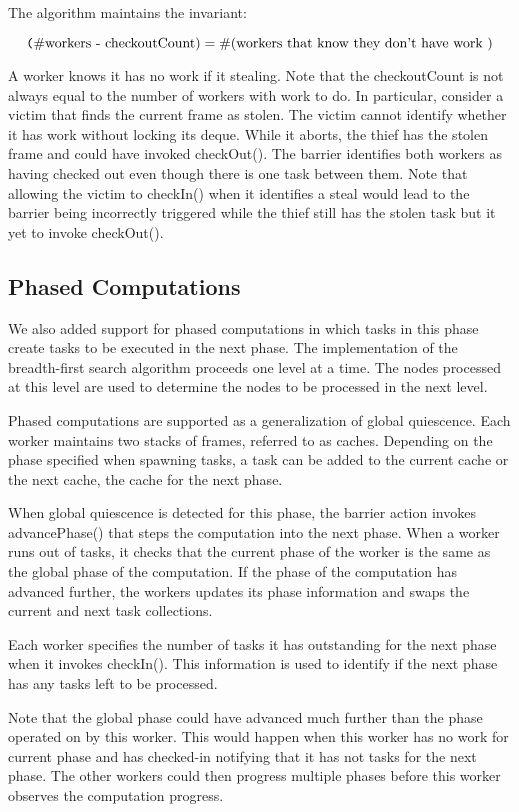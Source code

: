 The algorithm maintains the invariant:

\[
\mbox{{\texttt (\#workers - checkoutCount)}} = \mbox{\#(workers that know they don't
  have work )}
\]

A worker knows it has no work if it stealing. Note that the
checkoutCount is not always equal to the number of workers with work
to do. In particular, consider a victim that finds the current frame
as stolen. The victim cannot identify whether it has work without
locking its deque. While it aborts, the thief has the stolen
frame and could have invoked {\java checkOut()}. The barrier
identifies both workers as having checked out even though there is one
task between them. Note that allowing the victim to {\java
  checkIn()} when it identifies a steal would lead to the barrier
being incorrectly triggered while the thief still has the stolen task
but it yet to invoke {\java checkOut()}.


\subsection{Phased Computations}

We also added support for phased computations in which tasks in this
phase create tasks to be executed in the next phase. The
implementation of the breadth-first search algorithm proceeds one
level at a time. The nodes processed at this level are used to
determine the nodes to be processed in the next level.

Phased computations are supported as a generalization of global
quiescence. Each worker maintains two stacks of frames, referred to as
caches. Depending on the phase specified when spawning tasks, a task
can be added to the current cache or the next cache, the cache for the
next phase. 

When global quiescence is detected for this phase, the barrier action
invokes {\java advancePhase()} that steps the computation into the
next phase. When a worker runs out of tasks, it checks that the
current phase of the worker is the same as the global phase of the
computation. If the phase of the computation has advanced further, the
workers updates its phase information and swaps the current and next
task collections. 

Each worker specifies the number of tasks it has
outstanding for the next phase when it invokes {\java
  checkIn()}. This information is used to identify if the next phase
has any tasks left to be processed. 

Note that the global phase could have advanced much further than the
phase operated on by this worker. This would happen when this worker
has no work for current phase and has checked-in notifying that it has
not tasks for the next phase. The other workers could then progress
multiple phases before this worker observes the computation progress. 

